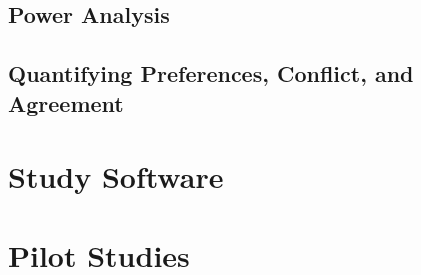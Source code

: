 \subsection{Power Analysis}

\subsection{Quantifying Preferences, Conflict, and Agreement}

\section{Study Software}

\section{Pilot Studies}